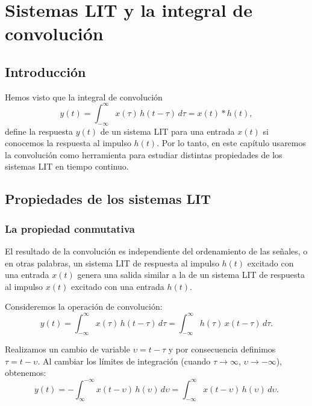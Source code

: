 \documentclass[11pt,a4paper,openany]{book}
\begin{document}
\chapter{Sistemas LIT y la integral de convolución}


\section{Introducción}

Hemos visto que la integral de convolución 
\begin{equation}
	y(t) = \int_{-\infty }^{\infty } x(\tau) \, h(t-\tau) \, d\tau = x(t) * h(t) ,
\end{equation}
define la respuesta $y(t)$ de un sistema LIT para una entrada $x(t)$ si conocemos la respuesta al impulso $h(t)$. Por lo tanto, en este capítulo usaremos la convolución como herramienta para estudiar distintas propiedades de los sistemas LIT en tiempo continuo.

\section{Propiedades de los sistemas LIT}

\subsection{La propiedad conmutativa}

El resultado de la convolución es independiente del ordenamiento de las señales, o en otras palabras, un sistema LIT de respuesta al impulso $h(t)$ excitado con una entrada $x(t)$ genera una salida similar a la de un sistema LIT de respuesta al impulso $x(t)$ excitado con una entrada $h(t)$.

Consideremos la operación de convolución:
\begin{equation}
	y(t) = \int_{-\infty }^{\infty } x(\tau) \, h(t-\tau) \, d\tau = \int_{-\infty }^{\infty } h(\tau) \, x(t-\tau) \, d\tau .
\end{equation}

Realizamos un cambio de variable $\upsilon = t - \tau$ y por consecuencia definimos $\tau = t - \upsilon$. Al cambiar los límites de integración (cuando $\tau \to \infty$, $\upsilon \to -\infty$), obtenemos:
\begin{equation}
	y(t) = -\int_{\infty }^{-\infty } x(t-\upsilon) \, h(\upsilon) \, d\upsilon = \int_{-\infty }^{\infty } x(t-\upsilon) \, h(\upsilon) \, d\upsilon .
\end{equation}
\end{document}
